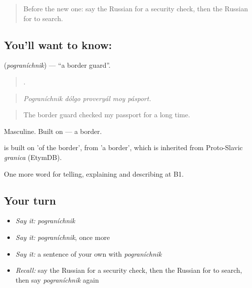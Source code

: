 \label{lesson:RU-C420-pogranichnik}



\begin{quote}
Before the new one: say the Russian for a security check, then the Russian for to search.
\end{quote}

\subsection*{You'll want to know: }
\textbf{} (\emph{pograníchnik}) — \textquotedblleft{}a border guard\textquotedblright{}.

\begin{quote}
    .
\end{quote}

\begin{quote}
\emph{Pograníchnik dólgo proveryál moy pásport.}
\end{quote}

\begin{quote}
The border guard checked my passport for a long time.
\end{quote}

Masculine. Built on \emph{} — a border.

\begin{cousinweb}
\emph{} is built on \emph{} 'of the border', from \emph{} 'a border', which is inherited from Proto-Slavic \emph{granica} (EtymDB).
\end{cousinweb}

\begin{grammarlens}[title={What you've built}]
One more word for telling, explaining and describing at B1.
\end{grammarlens}

\subsection*{Your turn}
\begin{itemize}
\raggedright
  \item \emph{Say it:} \emph{pograníchnik}
  \item \emph{Say it:} \emph{pograníchnik}, once more
  \item \emph{Say it:} a sentence of your own with \emph{pograníchnik}
  \item \emph{Recall:} say the Russian for a security check, then the Russian for to search, then say \emph{pograníchnik} again
\end{itemize}

